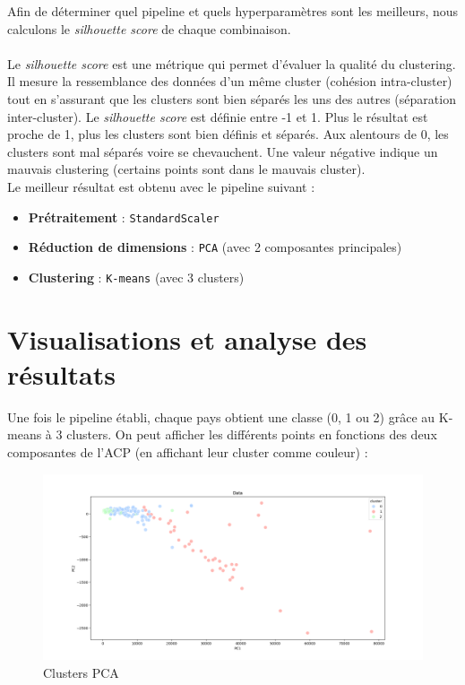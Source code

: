 \documentclass{article}
\begin{document}
\noindent Afin de déterminer quel pipeline et quels hyperparamètres sont les meilleurs, nous calculons le \textit{silhouette score} de chaque combinaison. \\ \\
Le \textit{silhouette score} est une métrique qui permet d’évaluer la qualité du clustering. Il mesure la ressemblance des données d’un même cluster (cohésion intra-cluster) tout en s’assurant que les clusters sont bien séparés les uns des autres (séparation inter-cluster). Le \textit{silhouette score} est définie entre -1 et 1. Plus le résultat est proche de 1, plus les clusters sont bien définis et séparés. Aux alentours de 0, les clusters sont mal séparés voire se chevauchent. Une valeur négative indique un mauvais clustering (certains points sont dans le mauvais cluster). \\

\noindent Le meilleur résultat est obtenu avec le pipeline suivant :

\begin{itemize}
    \item \textbf{Prétraitement} : \texttt{StandardScaler}
    \item \textbf{Réduction de dimensions} : \texttt{PCA} (avec 2 composantes principales)
    \item \textbf{Clustering} : \texttt{K-means} (avec 3 clusters)
\end{itemize}

\newpage
\section{Visualisations et analyse des résultats}

\noindent Une fois le pipeline établi, chaque pays obtient une classe (0, 1 ou 2) grâce au K-means à 3 clusters. On peut afficher les différents points en fonctions des deux composantes de l’ACP (en affichant leur cluster comme couleur) :

\begin{figure}[H]
    \centering
    \includegraphics[width=\linewidth]{plot/clusters_pca.png}
    \caption{Clusters PCA}
    \label{fig:clusters_pca}
\end{figure}
\end{document}
